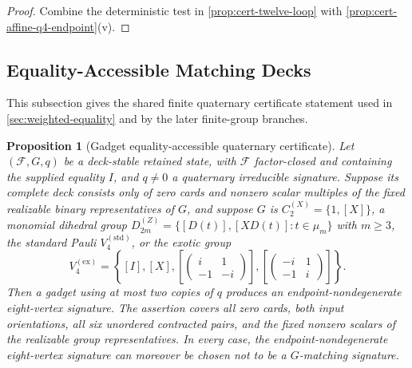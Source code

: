 \documentclass[11pt,letterpaper,onecolumn]{article}
\theoremstyle{plain}
\newtheorem{proposition}[proposition]{Proposition}
\theoremstyle{definition}
\theoremstyle{remark}
\newcommand{\cF}{\mathcal F}
\newcommand{\DihZ}[1]{{D_{#1}^{(Z)}}}
\newcommand{\CycX}[1]{{C_{#1}^{(X)}}}
\newcommand{\KleinStd}{{V_4^{(\mathrm{std})}}}
\newcommand{\KleinEx}{{V_4^{(\mathrm{ex})}}}
\begin{document}
\begin{proof}
Combine the deterministic test in \cref{prop:cert-twelve-loop} with
\cref{prop:cert-affine-q4-endpoint}\textnormal{(v)}.
\end{proof}

\subsection{Equality-Accessible Matching Decks}
\label{appsec:cert-equality-accessible}
\label{proofsubsec:cert-equality-q4-boundary}

This subsection gives the shared finite quaternary certificate statement used
in \cref{sec:weighted-equality} and by the later finite-group branches.

\begin{proposition}[Gadget equality-accessible quaternary certificate]
\label{prop:cert-equality-q4-boundary}
Let \((\cF,G,q)\) be a deck-stable retained state, with \(\cF\)
factor-closed and containing the supplied equality \(I\), and
\(q\ne0\) a quaternary irreducible signature.  Suppose its complete deck consists only of zero cards and nonzero scalar multiples of the fixed
realizable binary representatives of \(G\), and suppose
\(G\) is \(\CycX{2}=\{1,[X]\}\), a
monomial dihedral group
\(\DihZ{2m}=\{[D(t)],[XD(t)]:t\in\mu_m\}\) with \(m\ge3\), the
standard Pauli \(\KleinStd\), or the exotic group
\[
 \KleinEx=\left\{[I],[X],
 \left[\begin{pmatrix}i&1\\-1&-i\end{pmatrix}\right],
 \left[\begin{pmatrix}-i&1\\-1&i\end{pmatrix}\right]\right\}.
\]
Then a gadget using at most two copies
of \(q\) produces an endpoint-nondegenerate eight-vertex signature.  The assertion covers all
zero cards, both input orientations, all six unordered contracted pairs,
and the fixed nonzero scalars of the realizable group representatives.  In every
case, the endpoint-nondegenerate eight-vertex signature can moreover be chosen not to be a
\(G\)-matching signature.
\end{proposition}
\end{document}
